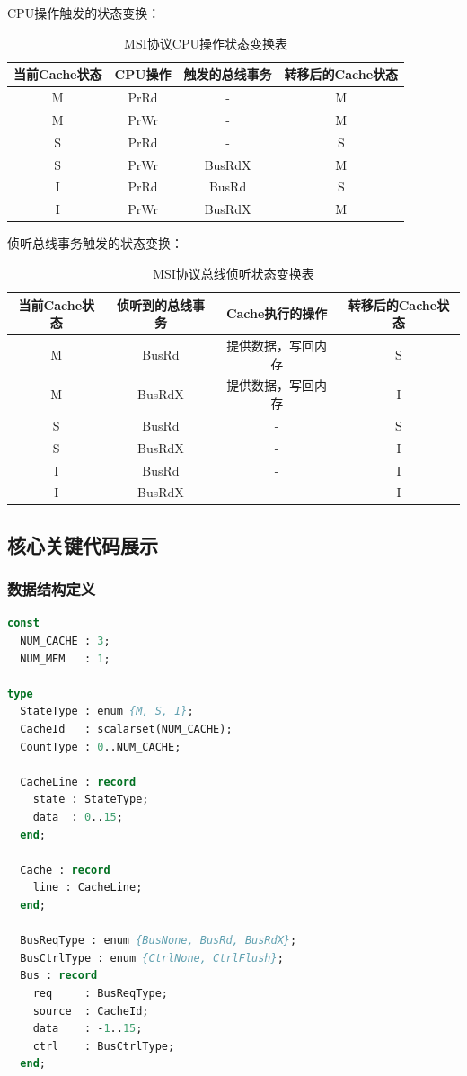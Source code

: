 \documentclass[a4paper]{article}
\begin{document}
CPU操作触发的状态变换：
\begin{table}[H]
\centering
\begin{tabular}{|c|c|c|c|}
\hline
当前Cache状态 & CPU操作 & 触发的总线事务 & 转移后的Cache状态 \\
\hline
M & PrRd & - & M \\
M & PrWr & - & M \\
S & PrRd & - & S \\
S & PrWr & BusRdX & M \\
I & PrRd & BusRd & S \\
I & PrWr & BusRdX & M \\
\hline
\end{tabular}
\caption{MSI协议CPU操作状态变换表}
\end{table}

侦听总线事务触发的状态变换：
\begin{table}[H]
\centering
\begin{tabular}{|c|c|c|c|}
\hline
当前Cache状态 & 侦听到的总线事务 & Cache执行的操作 & 转移后的Cache状态 \\
\hline
M & BusRd & 提供数据，写回内存 & S \\
M & BusRdX & 提供数据，写回内存 & I \\
S & BusRd & - & S \\
S & BusRdX & - & I \\
I & BusRd & - & I \\
I & BusRdX & - & I \\
\hline
\end{tabular}
\caption{MSI协议总线侦听状态变换表}
\end{table}

\subsection{核心关键代码展示}

\subsubsection{数据结构定义}

\begin{lstlisting}[language=pascal]
const
  NUM_CACHE : 3;
  NUM_MEM   : 1;

type
  StateType : enum {M, S, I};
  CacheId   : scalarset(NUM_CACHE);
  CountType : 0..NUM_CACHE;

  CacheLine : record
    state : StateType;
    data  : 0..15;
  end;

  Cache : record
    line : CacheLine;
  end;

  BusReqType : enum {BusNone, BusRd, BusRdX};
  BusCtrlType : enum {CtrlNone, CtrlFlush};
  Bus : record
    req     : BusReqType;
    source  : CacheId;
    data    : -1..15;
    ctrl    : BusCtrlType;
  end;
\end{lstlisting}
\end{document}
